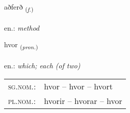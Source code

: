 \documentclass[frontgrid, backgrid]{flacards}\usepackage[]{graphicx}\usepackage[]{xcolor}
\begin{document}
\renewcommand{\blhead}{\vskip5pt {\small\bfseries\footnotesize Nafnorð | Noun }}
\renewcommand{\bcfoot}{\vskip5pt \hspace{2pt}{\small\bfseries\footnotesize 1K}}


{aðferð \small{\textsubscript{(\textit{f.})}} \\[1ex] %
\textphonetic{[aðfɛrð]} \\
en.: \emph{method} \\  [2ex]
\renewcommand*{\arraystretch}{0.8}
}

\renewcommand{\flhead}{\vskip5pt \fboxsep=0pt {\small\bfseries\footnotesize Fornafn | Pronoun}}
\renewcommand{\fcfoot}{\vskip5pt \fboxsep=0pt \hspace{2pt}{\small\bfseries\footnotesize 1K}}

\renewcommand{\blhead}{\vskip5pt {\small\bfseries\footnotesize Fornafn | Pronoun }}
\renewcommand{\bcfoot}{\vskip5pt \hspace{2pt}{\small\bfseries\footnotesize 1K}}


{hvor \small{\textsubscript{(\textit{pron.})}} \\[1ex] %
\textphonetic{[kʰvɔːr]} \\
en.: \emph{which; each (of two)} \\  [2ex]
\renewcommand*{\arraystretch}{0.8}
\begin{tabular}{ll}
\textsc{sg.nom.}: & hvor  --  hvor -- hvort \\ 
\textsc{pl.nom.}: & hvorir -- hvorar -- hvor
\end{tabular}
}

\renewcommand{\flhead}{\vskip5pt \fboxsep=0pt {\small\bfseries\footnotesize Nafnorð | Noun}}
\renewcommand{\fcfoot}{\vskip5pt \fboxsep=0pt \hspace{2pt}{\small\bfseries\footnotesize 1K}}
\end{document}

